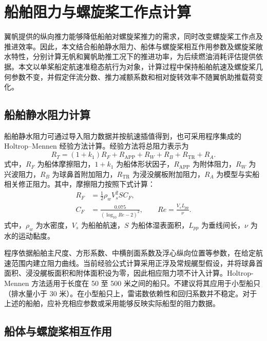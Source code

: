 \documentclass[UTF8,a4paper,twoside,zihao=5,fontset=windows]{ctexart}
\begin{document}
\section{船舶阻力与螺旋桨工作点计算}
\label{sec:ship_propeller}
翼帆提供的纵向推力能够降低船舶对螺旋桨推力的需求，同时改变螺旋桨工作点及推进效率。因此，本文结合船舶静水阻力、船体与螺旋桨相互作用参数及螺旋桨敞水特性，分别计算无帆和翼帆助推工况下的推进功率，为后续燃油消耗评估提供依据。本文以单桨船定航速准稳态航行为对象，计算过程中保持船舶航速及螺旋桨几何参数不变，并假定伴流分数、推力减额系数和相对旋转效率不随翼帆助推载荷变化。

\subsection{船舶静水阻力计算}

船舶静水阻力可通过导入阻力数据并按航速插值得到，也可采用程序集成的 Holtrop--Mennen 经验方法计算。经验方法将总阻力表示为
\begin{equation}
R_T=(1+k_1)R_F+R_{\mathrm{APP}}+R_W+R_B+R_{\mathrm{TR}}+R_A.
\label{eq:resistance}
\end{equation}
式中，$R_F$ 为船体摩擦阻力，$1+k_1$ 为船体形状因子，$R_{\mathrm{APP}}$ 为附体阻力，$R_W$ 为兴波阻力，$R_B$ 为球鼻首附加阻力，$R_{\mathrm{TR}}$ 为浸没艉板附加阻力，$R_A$ 为模型与实船相关修正阻力。其中，摩擦阻力按照下式计算：
\begin{equation}
\begin{aligned}
R_F&=\frac{1}{2}\rho_w V_s^2 S C_F,\\
C_F&=\frac{0.075}{(\log_{10}Re-2)^2},\qquad Re=\frac{V_sL_{pp}}{\nu}.
\end{aligned}
\label{eq:friction}
\end{equation}
式中，$\rho_w$ 为水密度，$V_s$ 为船舶航速，$S$ 为船体湿表面积，$L_{pp}$ 为垂线间长，$\nu$ 为水的运动黏度。

程序依据船舶主尺度、方形系数、中横剖面系数及浮心纵向位置等参数，在给定航速范围内建立阻力曲线。当前经验公式计算采用正浮及常规艉型假设，并将球鼻首面积、浸没艉板面积和附体面积设为零，因此相应阻力项不计入计算。Holtrop-Mennen 方法适用于长度在 50 至 500 米之间的船只。不建议将其应用于小型船只（排水量小于 30 米）。在小型船只上，雷诺数依赖性和回归系数并不稳定。对于上述的船舶，应补充相应参数或采用能够反映实际船型的阻力数据。

\subsection{船体与螺旋桨相互作用}
\end{document}
